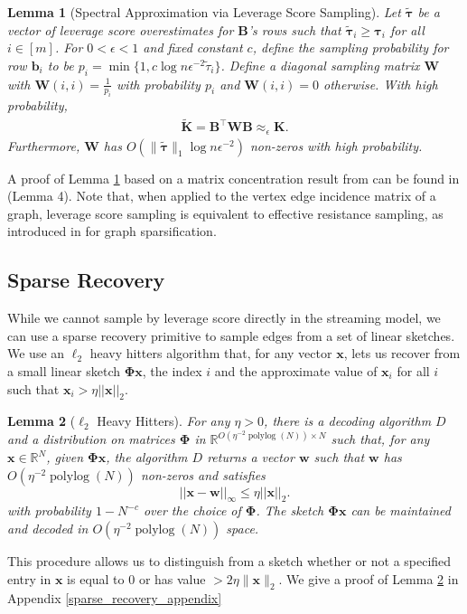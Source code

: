 \documentclass[11pt]{article}
\newcommand{\norm}[1]{\|#1\|}
\newcommand{\bs}[1]{\boldsymbol{#1}}
\newcommand{\bv}[1]{\mathbf{#1}}
\newcommand{\plog}{\mathop\mathrm{polylog}}
\newcommand{\R}{\mathbb{R}}
\newtheorem{lemma}{Lemma}
\begin{document}
\begin{lemma}[Spectral Approximation via Leverage Score Sampling]\label{sparsifier_sampling}
Let $\bs{\tilde \tau}$ be a vector of leverage score overestimates for $\bv{B}$'s rows such that $\bv{\tilde \tau}_i \ge \bv{\tau}_i$ for all $i \in [m]$. For $0 < \epsilon < 1$ and fixed constant $c$, define the sampling probability for row $\bv{b}_i$ to be $p_i = \min \{1,c \log n \epsilon^{-2} \tilde{\tau}_i\}$. Define a diagonal sampling matrix $\bv{W}$ with $\bv{W}(i,i) = \frac{1}{p_i}$ with probability $p_i$ and $\bv{W}(i,i) = 0$ otherwise. With high probability,
\begin{align*}
\bv{\tilde K} = \bv{B}^\top \bv{W} \bv{B} \approx_\epsilon \bv{K}.
\end{align*}
Furthermore, $\bv{W}$ has $O(\norm{\bs{\tilde \tau}}_1\log n \epsilon^{-2})$ non-zeros with high probability. \end{lemma}
A proof of Lemma \ref{sparsifier_sampling} based on a matrix concentration result from \cite{tropp2012user} can be found in \cite{uniformSampling} (Lemma 4). Note that, when applied to the vertex edge incidence matrix of a graph, leverage score sampling is equivalent to effective resistance sampling, as introduced in \cite{graphSparsificationEffectiveResistance} for graph sparsification.

\subsection{Sparse Recovery}
\label{sparse recovery}
While we cannot sample by leverage score directly in the streaming model, we can use a sparse recovery primitive to sample edges from a set of linear sketches. We use an $\ell_2$ heavy hitters algorithm that, for any vector $\bv{x}$, lets us recover from a small linear sketch $\bs{\Phi} \bv{x}$, the index $i$ and the approximate value of $\bv{x}_i$ for all $i$ such that $\bv{x}_i > \eta ||\bv{x}||_2$.

\begin{lemma}[$\ell_2$ Heavy Hitters]
\label{sparse_recovery_primitive}
For any $\eta >0$, there is a decoding algorithm $D$ and a distribution on matrices $\bv{\Phi}$ in $\R^{O(\eta^{-2} \plog( N)) \times N}$ such that, for any $\bv{x}\in \R^N$, given $\bs{\Phi} \bv{x}$, the algorithm $D$ returns a vector $\bv{w}$ such that
$\bv{w}$ has $O(\eta^{-2}\plog( N))$ non-zeros and satisfies
$$ ||\bv{x}-\bv{w}||_\infty \leq \eta ||\bv{x}||_2.$$
with probability $1-N^{-c}$ over the choice of $\bs{\Phi}$.
The sketch $\bv{\Phi} \bv{x}$ can be maintained and decoded in $O(\eta^{-2}\plog( N))$ space. 
\end{lemma}
This procedure allows us to distinguish from a sketch whether or not a specified entry in $\bv{x}$ is equal to 0 or has value $> 2\eta\|\bv{x}\|_2$. 
We give a proof of Lemma \ref{sparse_recovery_primitive} in Appendix \ref{sparse_recovery_appendix}
 
\end{document}
